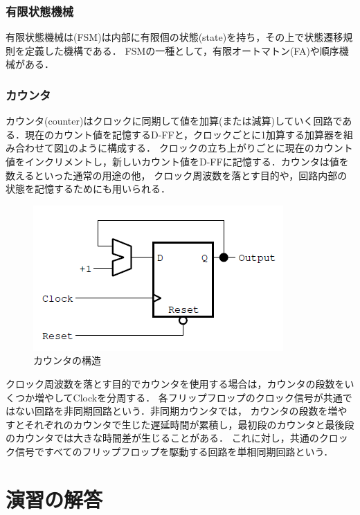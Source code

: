 \documentclass{jlreq}
\numberwithin{equation}{section}
\begin{document}
\subsubsection{有限状態機械}
有限状態機械は(FSM)は内部に有限個の状態(state)を持ち，その上で状態遷移規則を定義した機構である．
FSMの一種として，有限オートマトン(FA)や順序機械がある．

\subsubsection{カウンタ}
カウンタ(counter)はクロックに同期して値を加算(または減算)していく回路である．現在のカウント値を記憶するD-FFと，クロックごとに1加算する加算器を組み合わせて図\ref{fig:counter}のように構成する．
クロックの立ち上がりごとに現在のカウント値をインクリメントし，新しいカウント値をD-FFに記憶する．カウンタは値を数えるといった通常の用途の他，
クロック周波数を落とす目的や，回路内部の状態を記憶するためにも用いられる．
\begin{figure}
	\centering
	\includegraphics{assets/counter.png}
	\caption{カウンタの構造}
	\label{fig:counter}
\end{figure}

クロック周波数を落とす目的でカウンタを使用する場合は，カウンタの段数をいくつか増やしてClockを分周する．
各フリップフロップのクロック信号が共通ではない回路を非同期回路という．非同期カウンタでは，
カウンタの段数を増やすとそれぞれのカウンタで生じた遅延時間が累積し，最初段のカウンタと最後段のカウンタでは大きな時間差が生じることがある．
これに対し，共通のクロック信号ですべてのフリップフロップを駆動する回路を単相同期回路という．

\section{演習の解答}
\end{document}
